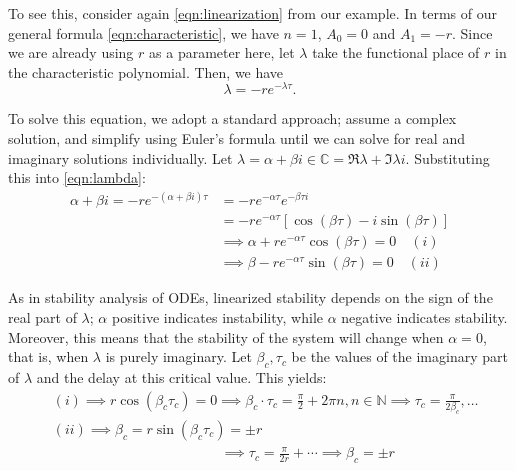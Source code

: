 \documentclass[12pt]{article}
\begin{document}
To see this, consider again \cref{eqn:linearization} from our example. In terms of our general formula \cref{eqn:characteristic}, we have $n = 1$, $A_0 = 0$ and $A_1 = -r$. Since we are already using $r$ as a parameter here, let $\lambda$ take the functional place of $r$ in the characteristic polynomial. Then, we have \begin{equation}\label{eqn:lambda}
    \lambda = -re^{-\lambda \tau}.
\end{equation}

To solve this equation, we adopt a standard approach; assume a complex solution, and simplify using Euler's formula until we can solve for real and imaginary solutions individually. Let $\lambda = \alpha + \beta i \in \mathbb{C} =\Re\lambda+ \Im\lambda i$. Substituting this into \cref{eqn:lambda}:
\begin{align*}
    \alpha + \beta i = -re^{-(\alpha + \beta i)\tau} &= -re^{-\alpha\tau}e^{-\beta\tau i}\\
    &= -re^{-\alpha \tau}\left[\cos\left(\beta \tau\right) - i \sin \left(\beta\tau \right)\right]\\
    &\implies \alpha +re^{-\alpha \tau} \cos (\beta \tau) = 0 \quad (i)\\
    &\implies \beta - re^{- \alpha \tau}\sin(\beta \tau) = 0\quad (ii)
\end{align*}

As in stability analysis of ODEs, linearized stability depends on the sign of the real part of $\lambda$; $\alpha$ positive indicates instability, while $\alpha$ negative indicates stability. Moreover, this means that the stability of the system will change when $\alpha = 0$, that is, when $\lambda$ is purely imaginary. Let $\beta_c, \tau_c$ be the values of the imaginary part of $\lambda$ and the delay at this critical value. This yields:
\begin{align*}
    &(i)\implies r \cos (\beta_c \tau_c) = 0\implies \beta_c\cdot \tau_c = \frac{\pi}{2} + 2\pi n, n \in \mathbb{N} \implies \tau_c = \frac{\pi}{2 \beta_c},\dots\\
    &(ii) \implies \beta_c = r \sin (\beta_c \tau_c) = \pm r \\
    &\hspace{12em}\implies \tau_c = \frac{\pi}{2 r} + \cdots \implies \beta_c = \pm r
\end{align*}
\end{document}
